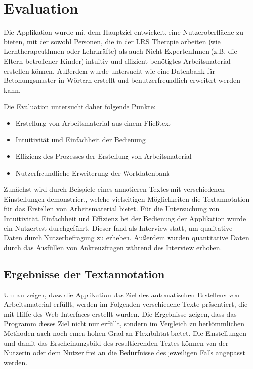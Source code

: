 
\chapter{Evaluation}

Die Applikation wurde mit dem Hauptziel entwickelt, eine Nutzeroberfläche zu bieten, mit der sowohl Personen, die in der LRS Therapie arbeiten (wie LerntherapeutInnen oder Lehrkräfte) als auch Nicht-ExpertenInnen (z.B. die Eltern betroffener Kinder) intuitiv und effizient benötigtes Arbeitsmaterial erstellen können. Außerdem wurde untersucht wie eine Datenbank für Betonungsmuster in Wörtern erstellt und benutzerfreundlich erweitert werden kann.

Die Evaluation untersucht daher folgende Punkte:
\begin{itemize}
	\item Erstellung von Arbeitsmaterial aus einem Fließtext
	\item Intuitivität und Einfachheit der Bedienung
	\item Effizienz des Prozesses der Erstellung von Arbeitsmaterial
	\item Nutzerfreundliche Erweiterung der Wortdatenbank
\end{itemize}

Zunächst wird durch Beispiele eines annotieren Textes mit verschiedenen Einstellungen demonstriert, welche vielseitigen Möglichkeiten die Textannotation für das Erstellen von Arbeitsmaterial bietet. Für die Untersuchung von Intuitivität, Einfachheit und Effizienz bei der Bedienung der Applikation wurde ein Nutzertest durchgeführt. Dieser fand als Interview statt, um qualitative Daten durch Nutzerbefragung zu erheben. Außerdem wurden quantitative Daten durch das Ausfüllen von Ankreuzfragen während des Interview erhoben.

\section{Ergebnisse der Textannotation}
\label{sec:annotation-results}

Um zu zeigen, dass die Applikation das Ziel des automatischen Erstellens von Arbeitsmaterial erfüllt, werden im Folgenden verschiedene Texte präsentiert, die mit Hilfe des Web Interfaces erstellt wurden. Die Ergebnisse zeigen, dass das Programm dieses Ziel nicht nur erfüllt, sondern im Vergleich zu herkömmlichen Methoden auch noch einen hohen Grad an Flexibilität bietet. Die Einstellungen und damit das Erscheinungsbild des resultierenden Textes können von der Nutzerin oder dem Nutzer frei an die Bedürfnisse des jeweiligen Falls angepasst werden.

